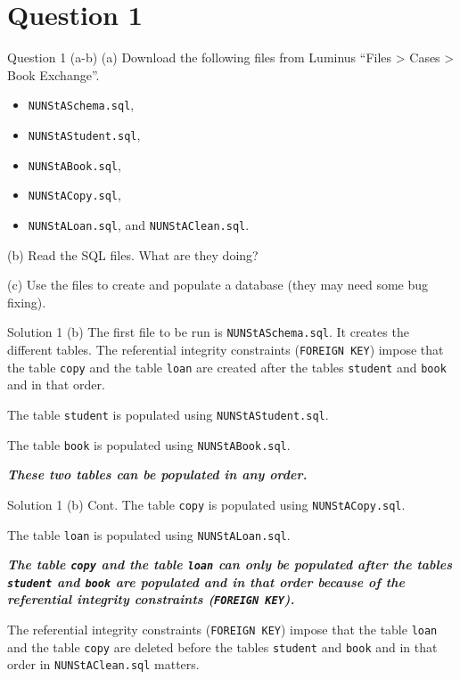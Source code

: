 \section*{Question 1}

\begin{frame}[fragile]{Question 1 (a-b)}
(a) Download the following files from Luminus ``Files > Cases > Book Exchange''.
\begin{itemize}
	\item[] \texttt{NUNStASchema.sql},
	\item[] \texttt{NUNStAStudent.sql},
	\item[] \texttt{NUNStABook.sql},
	\item[] \texttt{NUNStACopy.sql},
	\item[] \texttt{NUNStALoan.sql}, and \texttt{NUNStAClean.sql}.
\end{itemize}
\vspace{10pt}

(b) Read the SQL files. What are they doing? \vspace{10pt}

(c) Use the files to create and populate a database (they may need some bug fixing).
\end{frame}

\begin{frame}[fragile]{Solution 1 (b)}
The first file to be run is \texttt{NUNStASchema.sql}. It creates the different tables. The referential integrity constraints (\texttt{FOREIGN KEY}) impose that the table \texttt{copy} and the table \texttt{loan} are created after the tables \texttt{student} and \texttt{book} and in that order.\vspace{10pt}

The table \texttt{student} is populated using \texttt{NUNStAStudent.sql}. \vspace{10pt}

The table \texttt{book} is populated using \texttt{NUNStABook.sql}. \vspace{10pt}

\textbf{\textit{These two tables can be populated in any order.}} 
\end{frame}

\begin{frame}[fragile]{Solution 1 (b) Cont.}
The table \texttt{copy} is populated using \texttt{NUNStACopy.sql}. \vspace{10pt}

The table \texttt{loan} is populated using \texttt{NUNStALoan.sql}. \vspace{10pt}

\textit{\textbf{The table \texttt{copy} and the table \texttt{loan} can only be populated after the tables \texttt{student} and \texttt{book} are populated and in that order because of the referential integrity constraints (\texttt{FOREIGN KEY}).} } \vspace{10pt}

The referential integrity constraints (\texttt{FOREIGN KEY}) impose that the table \texttt{loan} and the table \texttt{copy} are deleted before the tables \texttt{student} and \texttt{book} and in that order in \texttt{NUNStAClean.sql} matters.
\end{frame}

